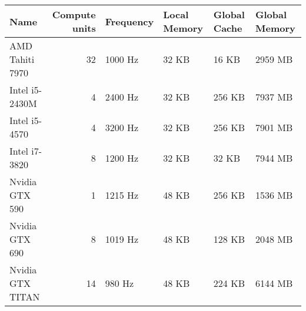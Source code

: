 \begin{tabular}{lrllll}
\toprule
             Name &  Compute units & Frequency & Local Memory & Global Cache & Global Memory \\
\midrule
  AMD Tahiti 7970 &             32 &   1000 Hz &        32 KB &        16 KB &       2959 MB \\
   Intel i5-2430M &              4 &   2400 Hz &        32 KB &       256 KB &       7937 MB \\
    Intel i5-4570 &              4 &   3200 Hz &        32 KB &       256 KB &       7901 MB \\
    Intel i7-3820 &              8 &   1200 Hz &        32 KB &        32 KB &       7944 MB \\
   Nvidia GTX 590 &              1 &   1215 Hz &        48 KB &       256 KB &       1536 MB \\
   Nvidia GTX 690 &              8 &   1019 Hz &        48 KB &       128 KB &       2048 MB \\
 Nvidia GTX TITAN &             14 &    980 Hz &        48 KB &       224 KB &       6144 MB \\
\bottomrule
\end{tabular}

